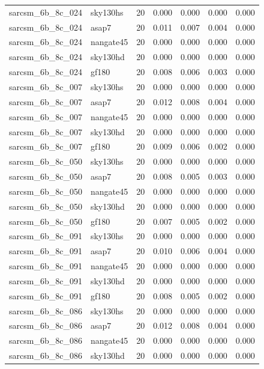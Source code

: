 \begin{tabular}{llrrrrr}
sarcsm\_6b\_8c\_024 & sky130hs & 20 & 0.000 & 0.000 & 0.000 & 0.000 \\
sarcsm\_6b\_8c\_024 & asap7 & 20 & 0.011 & 0.007 & 0.004 & 0.000 \\
sarcsm\_6b\_8c\_024 & nangate45 & 20 & 0.000 & 0.000 & 0.000 & 0.000 \\
sarcsm\_6b\_8c\_024 & sky130hd & 20 & 0.000 & 0.000 & 0.000 & 0.000 \\
sarcsm\_6b\_8c\_024 & gf180 & 20 & 0.008 & 0.006 & 0.003 & 0.000 \\
sarcsm\_6b\_8c\_007 & sky130hs & 20 & 0.000 & 0.000 & 0.000 & 0.000 \\
sarcsm\_6b\_8c\_007 & asap7 & 20 & 0.012 & 0.008 & 0.004 & 0.000 \\
sarcsm\_6b\_8c\_007 & nangate45 & 20 & 0.000 & 0.000 & 0.000 & 0.000 \\
sarcsm\_6b\_8c\_007 & sky130hd & 20 & 0.000 & 0.000 & 0.000 & 0.000 \\
sarcsm\_6b\_8c\_007 & gf180 & 20 & 0.009 & 0.006 & 0.002 & 0.000 \\
sarcsm\_6b\_8c\_050 & sky130hs & 20 & 0.000 & 0.000 & 0.000 & 0.000 \\
sarcsm\_6b\_8c\_050 & asap7 & 20 & 0.008 & 0.005 & 0.003 & 0.000 \\
sarcsm\_6b\_8c\_050 & nangate45 & 20 & 0.000 & 0.000 & 0.000 & 0.000 \\
sarcsm\_6b\_8c\_050 & sky130hd & 20 & 0.000 & 0.000 & 0.000 & 0.000 \\
sarcsm\_6b\_8c\_050 & gf180 & 20 & 0.007 & 0.005 & 0.002 & 0.000 \\
sarcsm\_6b\_8c\_091 & sky130hs & 20 & 0.000 & 0.000 & 0.000 & 0.000 \\
sarcsm\_6b\_8c\_091 & asap7 & 20 & 0.010 & 0.006 & 0.004 & 0.000 \\
sarcsm\_6b\_8c\_091 & nangate45 & 20 & 0.000 & 0.000 & 0.000 & 0.000 \\
sarcsm\_6b\_8c\_091 & sky130hd & 20 & 0.000 & 0.000 & 0.000 & 0.000 \\
sarcsm\_6b\_8c\_091 & gf180 & 20 & 0.008 & 0.005 & 0.002 & 0.000 \\
sarcsm\_6b\_8c\_086 & sky130hs & 20 & 0.000 & 0.000 & 0.000 & 0.000 \\
sarcsm\_6b\_8c\_086 & asap7 & 20 & 0.012 & 0.008 & 0.004 & 0.000 \\
sarcsm\_6b\_8c\_086 & nangate45 & 20 & 0.000 & 0.000 & 0.000 & 0.000 \\
sarcsm\_6b\_8c\_086 & sky130hd & 20 & 0.000 & 0.000 & 0.000 & 0.000 \\

\end{tabular}
